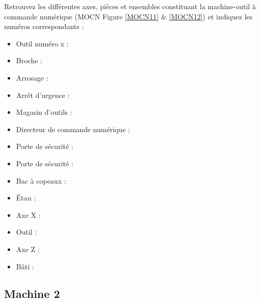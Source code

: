 \documentclass[12pt]{article}
\newcounter{exo}
\newenvironment{exo}{\stepcounter{exo}\vspace{0.5cm}{\bfseries Question \theexo\ :}}{\par\vspace{0.5cm}}
\begin{document}
\begin{exo}\label{exo1} Retrouvez les différentes axes, pièces et ensembles constituant la machine-outil à commande numérique (MOCN Figure \ref{MOCN11} \& \ref{MOCN12}) et indiquez les numéros correspondants :\\ \end{exo}
\begin{minipage}{.55\linewidth}
\begin{itemize}
    \item Outil numéro x :
    \item Broche :
    \item Arrosage :
    \item Arrêt d’urgence :
    \item Magasin d’outils :
    \item Directeur de commande numérique :
    \item Porte de sécurité :
\end{itemize}

\end{minipage}
\begin{minipage}{.44\linewidth}
\begin{itemize}
    \item Porte de sécurité :
    \item Bac à copeaux :
    \item Étau :
    \item Axe X :
    \item Outil :
    \item Axe Z :
    \item Bâti :
\end{itemize}
\end{minipage}













\subsection{Machine 2}
\end{document}

